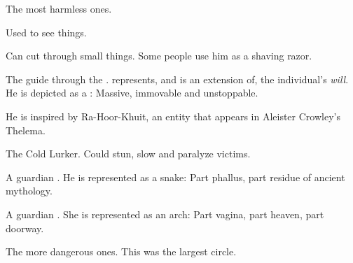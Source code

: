 \begin{subgloss}
  \begin{comment}
  \paragraph{Circle of Dusk}
  \end{comment}
  The most harmless ones. 
  
  \begin{sephlist}
    \seph{\Dweryog}
    \index{\Dweryog}
    Used to see things. 
    
    \seph{\Gavron}
    \index{\Gavron}
    Can cut through small things. 
    Some people use him as a shaving razor. 
    
    \seph{\KorRashad}
    \index{\KorRashad}
    The guide through the \empyrean{}. 
    \KorRashad{} represents, and is an extension of, the individual's \emph{will}. 
    He is depicted as a \mulgron: 
    Massive, immovable and unstoppable. 
    
    He is inspired by Ra-Hoor-Khuit, an entity that appears in Aleister Crowley's Thelema. 
    
    \seph{\OmmonThul}
    \index{\OmmonThul}
    The Cold Lurker. 
    Could stun, slow and paralyze victims. 
    
    A guardian \qliphah. 
    He is represented as a snake: 
    Part phallus, part residue of ancient \ophidian{} mythology. 
    
    A guardian \qliphah. 
    She is represented as an arch: 
    Part vagina, part heaven, part doorway. 
   
  \end{sephlist}




  \begin{comment}
  \paragraph{Circle of Twilight}
  \end{comment}
  The more dangerous ones. 
  This was the largest circle. 
  

\end{subgloss}
